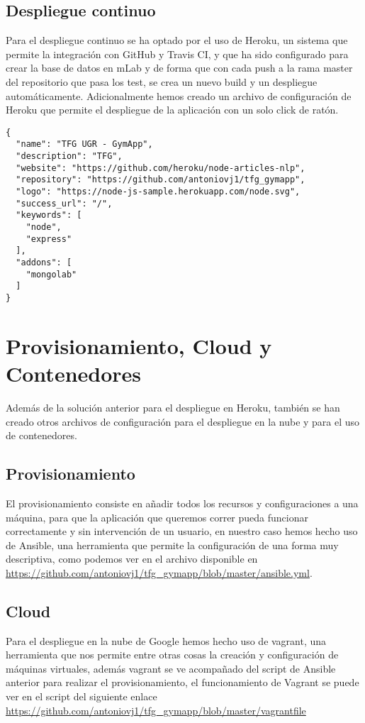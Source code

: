 \subsection {Despliegue continuo}
Para el despliegue continuo se ha optado por el uso de Heroku, un sistema que permite la integración con GitHub y Travis CI, y que ha sido configurado para crear la base de datos en mLab y de forma que con cada push a la rama master del repositorio que pasa los test, se crea un nuevo build y un despliegue automáticamente. Adicionalmente hemos creado un archivo de configuración de Heroku que permite el despliegue de la aplicación con un solo click de ratón.
\begin{lstlisting}
{
  "name": "TFG UGR - GymApp",
  "description": "TFG",
  "website": "https://github.com/heroku/node-articles-nlp",
  "repository": "https://github.com/antoniovj1/tfg_gymapp",
  "logo": "https://node-js-sample.herokuapp.com/node.svg",
  "success_url": "/",
  "keywords": [
    "node",
    "express"
  ],
  "addons": [
    "mongolab"
  ]
}
\end{lstlisting}
\section {Provisionamiento, Cloud y Contenedores}
Además de la solución anterior para el despliegue en Heroku, también se han creado otros archivos de configuración para el despliegue en la nube y para el uso de contenedores.

\subsection {Provisionamiento}
El provisionamiento consiste en añadir todos los recursos y configuraciones a una máquina, para que la aplicación que queremos correr pueda funcionar correctamente y sin intervención de un usuario, en nuestro caso hemos hecho uso de Ansible, una herramienta que permite la configuración de una forma muy descriptiva, como podemos ver en el archivo disponible en \url{https://github.com/antoniovj1/tfg_gymapp/blob/master/ansible.yml}.

\subsection {Cloud}
Para el despliegue en la nube de Google hemos hecho uso de vagrant, una herramienta que nos permite entre otras cosas la creación y configuración de máquinas virtuales, además vagrant se ve acompañado del script de Ansible anterior para realizar el provisionamiento, el funcionamiento de Vagrant se puede ver en el script del siguiente enlace \url{https://github.com/antoniovj1/tfg_gymapp/blob/master/vagrantfile}




